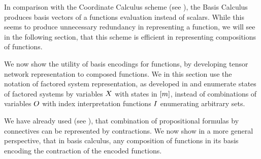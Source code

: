 In comparison with the Coordinate Calculus scheme (see ), the Basis Calculus produces basis vectors of a functions evaluation instead of scalars.
While this seems to produce unnecessary redundancy in representing a function, we will see in the following section, that this scheme is efficient in representing compositions of functions.


We now show the utility of basis encodings for functions, by developing tensor network representation to composed functions.
We in this section use the notation of factored system representation, as developed in  and enumerate states of factored systems by variables $X$ with states in $[m]$, instead of combinations of variables $O$ with index interpretation functions $I$ enumerating arbitrary sets.


We have already used (see ), that combination of propositional formulas by connectives can be represented by contractions.
We now show in a more general perspective, that in basis calculus, any composition of functions in its basis encoding the contraction of the encoded functions.

